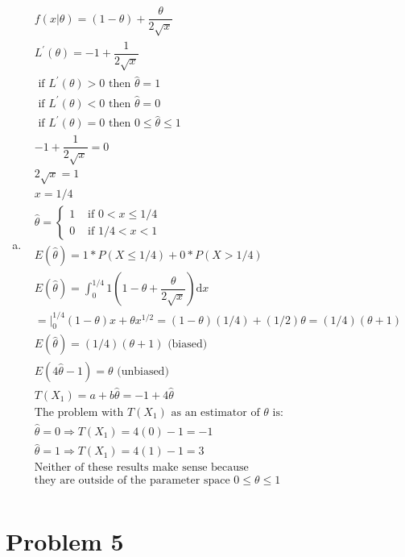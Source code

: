 \documentclass{article}
\newcommand{\dx}{\mathrm{d}x}
\newcommand{\hth}{\hat{\theta}}
\newcommand{\ta}{\theta}
\begin{document}
\begin{flushleft}
\begin{enumerate}[(a)]
	\item 
\begin{multline*}\\
f(x|\ta)=(1-\ta)+\dfrac{\ta}{2\sqrt{x}}\\
L^{\prime}(\ta)=-1+\dfrac{1}{2\sqrt{x}}\\
\text{ if } L^{\prime}(\ta)>0 \text{ then } \hth=1\\
\text{ if } L^{\prime}(\ta)<0 \text{ then } \hth=0\\
\text{ if } L^{\prime}(\ta)=0 \text{ then } 0\leq\hth\leq 1\\
-1+\dfrac{1}{2\sqrt{x}}=0\\
2\sqrt{x}=1\\
x=1/4\\
\hth=\begin{cases}
1 & \text{ if } 0<x\leq 1/4\\
0 & \text{ if } 1/4<x<1
\end{cases}\\
E(\hth)=1*P(X\leq 1/4)+0*P(X>1/4)\\
E(\hth)=\int_{0}^{1/4}1(1-\ta+\dfrac{\ta}{2\sqrt{x}})\dx\\
=\bigg |_{0}^{1/4} (1-\ta) x+\ta x^{1/2}=(1-\ta)(1/4)+(1/2)\ta=(1/4)(\ta+1)\\
E(\hth)=(1/4)(\ta+1) \text{ (biased)}\\
E(4\hth-1)=\ta \text{ (unbiased)}\\
T(X_1)=a+b\hth=-1+4\hth\\
\text{The problem with } T(X_1) \text{ as an estimator of } \ta \text{ is:}\\
\hth=0 \Rightarrow T(X_1)=4(0)-1=-1\\
\hth=1 \Rightarrow T(X_1)=4(1)-1=3\\
\text{Neither of these results make sense because}\\
\text{they are outside of the parameter space } 0\leq \ta\leq 1\\
\end{multline*}

\end{enumerate}

	\section*{Problem 5}
\begin{enumerate}[(a)]
	

\end{enumerate}
\end{flushleft}
\end{document}
